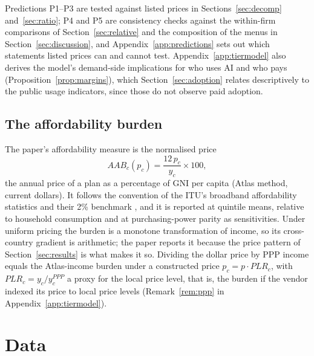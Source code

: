 \documentclass[11pt]{article}
\theoremstyle{definition}
\theoremstyle{remark}
\newcommand{\AAB}{\mathit{AAB}}
\begin{document}
Predictions P1--P3 are tested against listed prices in Sections~\ref{sec:decomp} and~\ref{sec:ratio}; P4 and P5 are consistency checks against the within-firm comparisons of Section~\ref{sec:relative} and the composition of the menus in Section~\ref{sec:discussion}, and Appendix~\ref{app:predictions} sets out which statements listed prices can and cannot test. Appendix~\ref{app:tiermodel} also derives the model's demand-side implications for who uses AI and who pays (Proposition~\ref{prop:margins}), which Section~\ref{sec:adoption} relates descriptively to the public usage indicators, since those do not observe paid adoption.

\subsection{The affordability burden}\label{sec:burden_def}

The paper's affordability measure is the normalised price
\begin{equation}
\AAB_c(p_c) = \frac{12\,p_c}{y_c}\times 100 ,
\label{eq:aab}
\end{equation}
the annual price of a plan as a percentage of GNI per capita (Atlas method, current dollars). It follows the convention of the ITU's broadband affordability statistics and their 2\% benchmark \citep{itu2025ff}, and it is reported at quintile means, relative to household consumption and at purchasing-power parity as sensitivities. Under uniform pricing the burden is a monotone transformation of income, so its cross-country gradient is arithmetic; the paper reports it because the price pattern of Section~\ref{sec:results} is what makes it so. Dividing the dollar price by PPP income equals the Atlas-income burden under a constructed price $p_c=p\cdot PLR_c$, with $PLR_c=y_c/y^{PPP}_c$ a proxy for the local price level, that is, the burden if the vendor indexed its price to local price levels (Remark~\ref{rem:ppp} in Appendix~\ref{app:tiermodel}).
\section{Data}\label{sec:data}
\end{document}
